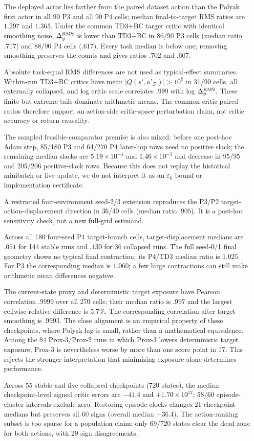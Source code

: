 \documentclass[twoside]{article}
\begin{document}
The deployed actor lies farther from the paired dataset action than the Polyak
first actor in all 90 P3 and all 90 P4 cells; median final-to-target RMS ratios
are $1.297$ and $1.365$. Under the common TD3+BC target critic with identical
smoothing noise, $\Delta_y^{\rm RMS}$ is lower than TD3+BC in 86/90 P3 cells
(median ratio $.717$) and 88/90 P4 cells ($.617$). Every task median is below
one; removing smoothing preserves the counts and gives ratios $.702$ and
$.607$.

Absolute task-equal RMS differences are not used as typical-effect summaries.
Within-run TD3+BC critics have mean $|Q(s',a'_{\mathcal D})|>10^9$ in 31/90
cells, all externally collapsed, and log critic scale correlates $.999$ with
log $\Delta_y^{\rm RMS}$. These finite but extreme tails dominate arithmetic
means. The common-critic paired ratios therefore support an action-side
critic-space perturbation claim, not critic accuracy or return causality.

The sampled feasible-comparator premise is also mixed: before one post-hoc
Adam step, 85/180 P3 and 64/270 P4 later-hop rows need no positive slack; the
remaining median slacks are $5.19\times10^{-4}$ and
$1.46\times10^{-3}$ and decrease in 95/95 and 205/206 positive-slack rows.
Because this does not replay the historical minibatch or live update, we do
not interpret it as an $\varepsilon_k$ bound or implementation certificate.

A restricted four-environment seed-2/3 extension reproduces the P3/P2
target-action-displacement direction in 36/40 cells (median ratio $.905$). It is a post-hoc
sensitivity check, not a new full-grid estimand.

Across all 180 four-seed P4 target-branch cells, target-displacement medians
are $.051$ for 144 stable runs and $.130$ for 36 collapsed runs. The full
seed-0/1 final geometry shows no typical final contraction: its P4/TD3 median
ratio is $1.025$. For P3 the corresponding median is $1.060$; a few large
contractions can still make arithmetic mean differences negative.

The current-state proxy and deterministic target exposure have Pearson
correlation $.9999$ over all 270 cells; their median ratio is $.997$ and the
largest cellwise relative difference is $5.7\%$. The corresponding
correlation after target smoothing is $.9993$. The close alignment is an
empirical property of these checkpoints, where Polyak lag is small, rather
than a mathematical equivalence. Among the 84 Prox-3/Prox-2 runs in which
Prox-3 lowers deterministic target exposure, Prox-3 is nevertheless worse by
more than one score point in 17. This rejects the stronger interpretation
that minimizing exposure alone determines performance.

Across 55 stable and five collapsed checkpoints (720 states), the median
checkpoint-level signed critic errors are $-41.4$ and
$+1.70\times10^{12}$; 58/60 episode-cluster intervals exclude zero.
Restoring episode clocks changes 21 checkpoint medians but preserves all 60
signs (overall median $-36.4$). The action-ranking subset is too sparse for a
population claim: only 69/720 states clear the dead zone for both actions, with
29 sign disagreements.
\end{document}
